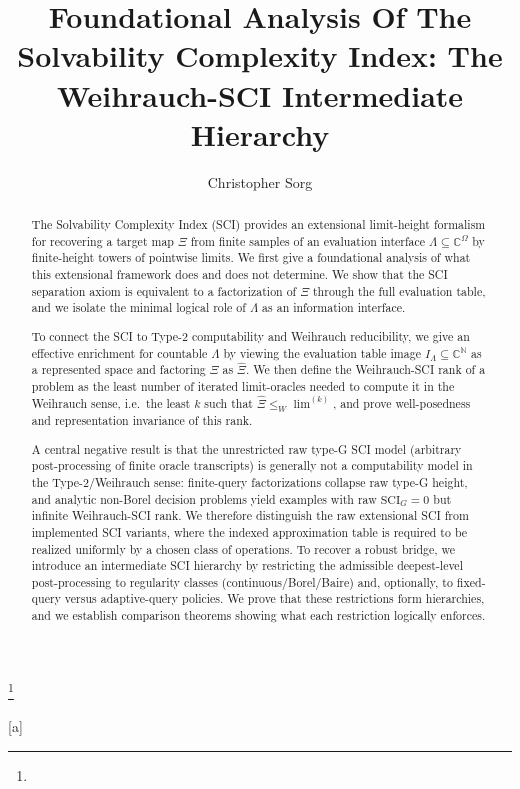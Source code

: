 \documentclass{lmcs} %
\theoremstyle{plain}
\theoremstyle{plain}
\theoremstyle{definition}
\theoremstyle{remark}
\theoremstyle{definition}
\theoremstyle{remark}
\numberwithin{equation}{section}
\newcommand{\SCIG}{\mathrm{SCI}_G}
\begin{document}
\title[Foundational Analysis Of The Solvability Complexity Index]{Foundational Analysis Of The Solvability Complexity Index: The Weihrauch-SCI Intermediate Hierarchy}
\thanks{}	%

\author[C.~Sorg]{Christopher Sorg}[a]
\address{University of the Bundeswehr Munich, Werner-Heisenberg-Weg 39, 85577 Neubiberg, Germany}	%

\begin{abstract}
\noindent The Solvability Complexity Index (SCI) provides an extensional limit-height formalism for recovering a target map \(\Xi\) from finite samples of an evaluation interface \(\Lambda\subseteq\mathbb C^\Omega\) by finite-height towers of pointwise limits. We first give a foundational analysis of what this extensional framework does and does not determine.
We show that the SCI separation axiom is equivalent to a factorization of $\Xi$ through the full evaluation table, and we isolate the minimal logical role of $\Lambda$ as an information interface.

To connect the SCI to Type-2 computability and Weihrauch reducibility, we give an effective enrichment for countable $\Lambda$ by viewing the evaluation table image $I_{\Lambda}\subseteq\mathbb{C}^{\mathbb{N}}$ as a represented space and factoring $\Xi$ as $\widehat{\Xi}$.
We then define the Weihrauch-SCI rank of a problem as the least number of iterated limit-oracles needed to compute it in the Weihrauch sense, i.e.\ the least $k$ such that
$\widehat{\Xi}\le_{W}\lim^{(k)}$, and prove well-posedness and representation invariance of this rank.

A central negative result is that the unrestricted raw type-G SCI model (arbitrary post-processing of finite oracle transcripts) is generally not a computability model in the Type-2/Weihrauch sense: finite-query factorizations collapse raw type-G height, and analytic non-Borel decision problems yield examples with raw \(\SCIG=0\) but infinite Weihrauch-SCI rank. We therefore distinguish the raw extensional SCI from implemented SCI variants, where the indexed approximation table is required to be realized uniformly by a chosen class of operations.
To recover a robust bridge, we introduce an intermediate SCI hierarchy by restricting the admissible deepest-level post-processing to regularity classes (continuous/Borel/Baire) and, optionally, to fixed-query versus adaptive-query policies. We prove that these restrictions form hierarchies, and we establish comparison theorems showing what each restriction logically enforces.


\end{abstract}
\end{document}
